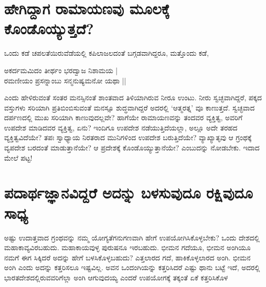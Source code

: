 \section*{ಹೇಗಿದ್ದಾಗ ರಾಮಾಯಣವು ಮೂಲಕ್ಕೆ ಕೊಂಡೊಯ್ಯುತ್ತದೆ?} 

ಒಂದು ಕಡೆ ಚಪಲತೆಯಿರುವೆಡೆಯಲ್ಲಿ ಕಪಿಲಾಜಲದಂತೆ ಬಗ್ಗಡವಾಗಿದ್ದರೂ, ಮತ್ತೊಂದು ಕಡೆ, 


\begin{shloka}
ಅಕರ್ದಮಮಿದಂ ತೀರ್ಥಂ ಭರದ್ವಾಜ ನಿಶಾಮಯ |\label{175}\\ 
ರಮಣೀಯಂ ಪ್ರಸನ್ನಾಂಬು ಸನ್ಮನುಷ್ಯಮನೋ ಯಥಾ ||
\end{shloka} 


ಎಂದು ಹೇಳಿರುವಂತೆ ಸಂತರ ಮನಸ್ಸಿನಂತೆ ಶಾಂತವಾದ ತಿಳಿಯಾಗಿರುವ ನೀರೂ ಉಂಟು. ನೀರು ಸ್ವಚ್ಛವಾಗಿದ್ದರೆ, ಪಕ್ಕದ ವಸ್ತುಗಳು ಸರಿಯಾಗಿ ಪ್ರತಿಬಿಂಬಿಸುವಂತೆ ಮನಸ್ಸೂ ಶುದ್ಧವಾಗಿದ್ದರೆ ಅದರಲ್ಲಿ `ಆತ್ಮರತ್ನ' ವೂ ಕಾಣುತ್ತದೆ. ಸ್ವಚ್ಛವಾದ ದರ್ಪಣದಲ್ಲಿ ಮುಖ ಸರಿಯಾಗಿ ಕಾಣುವುದಲ್ಲವೇ? ಹಾಗೆಯೇ ರಾಮಾಯಣವನ್ನು ತಂದವರ ವ್ಯಕ್ತಿತ್ವ, ಅವರಿಗೆ ಉಪದೇಶ ಮಾಡಿದವರ ವ್ಯಕ್ತಿತ್ವ, ಏನು? ಇಂದಿಗೂ ಉಪದೇಶ ನಡೆಯುತ್ತಿದೆಯಲ್ಲಾ, ಅಲ್ಲೂ ಅದೇ ತರಹದ ವ್ಯಕ್ತಿತ್ವವಿದೆಯೇ? ತಪಃ ಸ್ವಾಧ್ಯಾಯ ನಿರತರಾದ ಮುನಿಗಳಿಂದ ಉಪದೇಶ ಬರುತ್ತಿದೆಯೇ? ವ್ಯಾಖ್ಯಾತೃವು ಆ ಗ್ರಂಥಕ್ಕೆ ವ್ಯಪದೇಶ ಬರದಂತೆ ಮಾಡುತ್ತಾನೆಯೇ? ಆ ಪ್ರದೇಶಕ್ಕೆ ಕೊಂಡೊಯ್ಯುತ್ತಾನೆಯೇ? ಎಂಬುದನ್ನು ನೋಡಬೇಕು. ಇದಾದ ಮೇಲೆ ಪಟ್ಟ! 

\section*{ಪದಾರ್ಥಜ್ಞಾನವಿದ್ದರೆ ಅದನ್ನು ಬಳಸುವುದೂ ರಕ್ಷಿವುದೂ ಸಾಧ್ಯ} 

ಅಷ್ಟು ಉದಾತ್ತವಾದ ಗ್ರಂಥವನ್ನು ನಮ್ಮ ಯೋಗ್ಯತೆಗನುಗಣವಾಗಿ ಹೇಗೆ ಉಪಯೋಗಿಸಿಕೊಳ್ಳಬೇಕು? ಒಂದು ದೇಶದಲ್ಲಿ ಮಹಾಕಾವ್ಯವಿರಬಹುದು. ಮಹಾಕಾಯವುಳ್ಳ ಪುರುಷನೂ ಇರಬಹುದು. ಭೀಮನ ಗದೆಯೂ, ಭೀಮನ ಅಂಗಿಯೂ ನಮಗೆ ಈಗ ಸಿಕ್ಕಿದರೆ ಅದನ್ನು ಹೇಗೆ ಬಳಸಿಕೊಳ್ಳಬಹುದು? ಎತ್ತಲಾರದ ಗದೆ, ಹಾಕಿಕೊಳ್ಳಲಾರದ ಅಂಗಿ. ಭೀಮನ ಅಂಗಿ ಎಂದು ಅದನ್ನು ಕತ್ತರಿಸಲೂ ಇಷ್ಟವಿಲ್ಲ. ಅವನ ಒಂದಂಗಿಯನ್ನು ಕತ್ತರಿಸಿದರೆ ಎಷ್ಟು ಥಾನು ಬಟ್ಟೆ ಇದೆ, ಅದರಲ್ಲಿ ಭಾರತದೇಶದಲ್ಲಿರುವವರಿಗೆಲ್ಲಾ ಅಂಗಿ ಆಗುವುದಯ್ಯ ಎಂದರೆ ಉಪಯೋಗಕ್ಕೆ ತಕ್ಕಂತೆ ಏಕೆ ಕತ್ತರಿಸಿಕೊಳ


